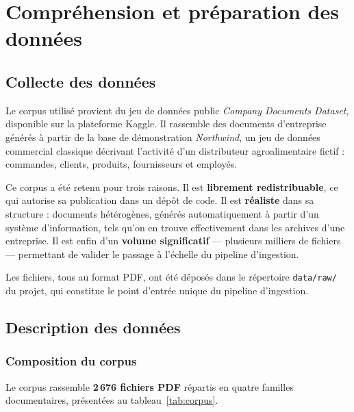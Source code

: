 \chapter{Compréhension et préparation des données}
\label{ch:donnees}

\section{Collecte des données}

Le corpus utilisé provient du jeu de données public \emph{Company Documents
Dataset}, disponible sur la plateforme Kaggle. Il rassemble des documents
d'entreprise générés à partir de la base de démonstration \emph{Northwind}, un
jeu de données commercial classique décrivant l'activité d'un distributeur
agroalimentaire fictif : commandes, clients, produits, fournisseurs et
employés.

Ce corpus a été retenu pour trois raisons. Il est \textbf{librement
redistribuable}, ce qui autorise sa publication dans un dépôt de code. Il est
\textbf{réaliste} dans sa structure : documents hétérogènes, générés
automatiquement à partir d'un système d'information, tels qu'on en trouve
effectivement dans les archives d'une entreprise. Il est enfin d'un
\textbf{volume significatif} --- plusieurs milliers de fichiers --- permettant
de valider le passage à l'échelle du pipeline d'ingestion.

Les fichiers, tous au format PDF, ont été déposés dans le répertoire
\texttt{data/raw/} du projet, qui constitue le point d'entrée unique du pipeline
d'ingestion.

\section{Description des données}

\subsection{Composition du corpus}

Le corpus rassemble \textbf{2\,676 fichiers PDF} répartis en quatre familles
documentaires, présentées au tableau~\ref{tab:corpus}.

